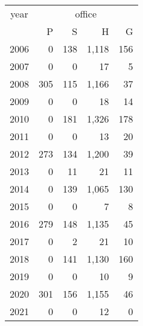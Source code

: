 \footnotesize\begin{tabular}[t]{lrrrr}
\toprule
\multicolumn{1}{c}{year} & \multicolumn{4}{c}{office} \\
\cmidrule(l{3pt}r{3pt}){1-1} \cmidrule(l{3pt}r{3pt}){2-5}
  & P & S & H & G\\
\midrule
2006 & 0 & 138 & 1,118 & 156\\
2007 & 0 & 0 & 17 & 5\\
2008 & 305 & 115 & 1,166 & 37\\
2009 & 0 & 0 & 18 & 14\\
2010 & 0 & 181 & 1,326 & 178\\
2011 & 0 & 0 & 13 & 20\\
2012 & 273 & 134 & 1,200 & 39\\
2013 & 0 & 11 & 21 & 11\\
2014 & 0 & 139 & 1,065 & 130\\
2015 & 0 & 0 & 7 & 8\\
2016 & 279 & 148 & 1,135 & 45\\
2017 & 0 & 2 & 21 & 10\\
2018 & 0 & 141 & 1,130 & 160\\
2019 & 0 & 0 & 10 & 9\\
2020 & 301 & 156 & 1,155 & 46\\
2021 & 0 & 0 & 12 & 0\\
\bottomrule
\end{tabular}
